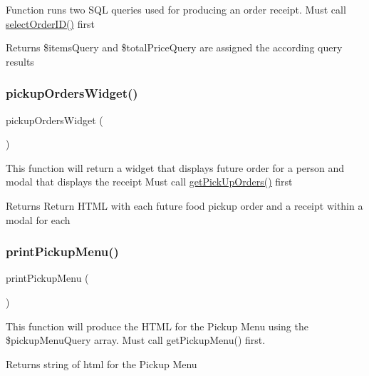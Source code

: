 Function runs two S\+QL queries used for producing an order receipt. Must call \mbox{\hyperlink{_pickup___order___selection_8class_8php_ad8c931daea4616337e35d0add407efa0}{select\+Order\+I\+D()}} first \begin{DoxyReturn}{Returns}
\$items\+Query and \$total\+Price\+Query are assigned the according query results 
\end{DoxyReturn}
\mbox{\label{_pickup___order___selection_8class_8php_a5cb8f6b7424fd9b9178daeaf22b9d31f}} 
\subsubsection{\texorpdfstring{pickupOrdersWidget()}{pickupOrdersWidget()}}
{\footnotesize\ttfamily pickup\+Orders\+Widget (\begin{DoxyParamCaption}{ }\end{DoxyParamCaption})}

This function will return a widget that displays future order for a person and modal that displays the receipt Must call \mbox{\hyperlink{_pickup___order___selection_8class_8php_a610ed5203a0a81eb865c12a6ce45f5b8}{get\+Pick\+Up\+Orders()}} first \begin{DoxyReturn}{Returns}
Return H\+T\+ML with each future food pickup order and a receipt within a modal for each 
\end{DoxyReturn}
\mbox{\label{_pickup___order___selection_8class_8php_a59933fbd264fc2a62d9a74e50ebb98fd}} 
\subsubsection{\texorpdfstring{printPickupMenu()}{printPickupMenu()}}
{\footnotesize\ttfamily print\+Pickup\+Menu (\begin{DoxyParamCaption}{ }\end{DoxyParamCaption})}

This function will produce the H\+T\+ML for the Pickup Menu using the \$pickup\+Menu\+Query array. Must call get\+Pickup\+Menu() first. \begin{DoxyReturn}{Returns}
string of html for the Pickup Menu 
\end{DoxyReturn}
\mbox{\label{_pickup___order___selection_8class_8php_a3b05a1e41412a6594da4671a32eb73cd}} 
